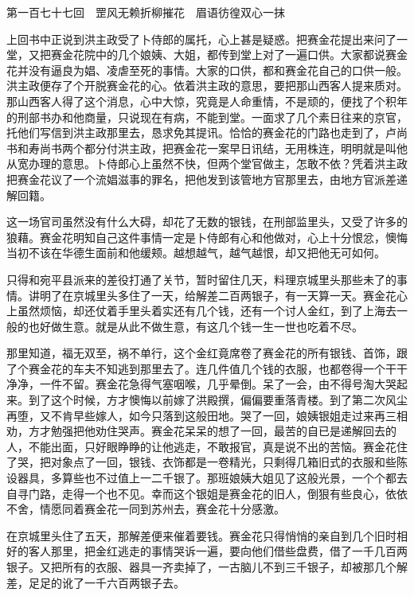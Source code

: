 \documentclass[12pt,UTF8]{ctexbook}
\begin{document}
{{{第一百七十七回　罡风无赖折柳摧花　眉语彷徨双心一抹





上回书中正说到洪主政受了卜侍郎的属托，心上甚是疑惑。把赛金花提出来问了一堂，又把赛金花院中的几个娘姨、大姐，都传到堂上对了一遍口供。大家都说赛金花并没有逼良为娼、凌虐至死的事情。大家的口供，都和赛金花自己的口供一般。洪主政便存了个开脱赛金花的心。依着洪主政的意思，要把那山西客人提来质对。那山西客人得了这个消息，心中大惊，究竟是人命重情，不是顽的，便找了个积年的刑部书办和他商量，只说现在有病，不能到堂。一面求了几个素日往来的京官，托他们写信到洪主政那里去，恳求免其提讯。恰恰的赛金花的门路也走到了，卢尚书和寿尚书两个都分付洪主政，把赛金花一案早日讯结，无用株连，明明就是叫他从宽办理的意思。卜侍郎心上虽然不快，但两个堂官做主，怎敢不依？凭着洪主政把赛金花议了一个流娼滋事的罪名，把他发到该管地方官那里去，由地方官派差递解回籍。

这一场官司虽然没有什么大碍，却花了无数的银钱，在刑部监里头，又受了许多的狼藉。赛金花明知自己这件事情一定是卜侍郎有心和他做对，心上十分恨忿，懊悔当初不该在华德生面前和他缓颊。越想越气，越气越恨，却又把他无可如何。

只得和宛平县派来的差役打通了关节，暂时留住几天，料理京城里头那些未了的事情。讲明了在京城里头多住了一天，给解差二百两银子，有一天算一天。赛金花心上虽然烦恼，却还仗着手里头着实还有几个钱，还有一个讨人金红，到了上海去一般的也好做生意。就是从此不做生意，有这几个钱一生一世也吃着不尽。

那里知道，福无双至，祸不单行，这个金红竟席卷了赛金花的所有银钱、首饰，跟了个赛金花的车夫不知逃到那里去了。连几件值几个钱的衣服，也都卷得一个干干净净，一件不留。赛金花急得气塞咽喉，几乎晕倒。呆了一会，由不得号淘大哭起来。到了这个时候，方才懊悔以前嫁了洪殿撰，偏偏要重落青楼。到了第二次风尘再堕，又不肯早些嫁人，如今只落到这般田地。哭了一回，娘姨银姐走过来再三相劝，方才勉强把他劝住哭声。赛金花呆呆的想了一回，最苦的自已是递解回去的人，不能出面，只好眼睁睁的让他逃走，不敢报官，真是说不出的苦恼。赛金花住了哭，把对象点了一回，银钱、衣饰都是一卷精光，只剩得几箱旧式的衣服和些陈设器具，多算些也不过值上一二千银了。那班娘姨大姐见了这般光景，一个个都去自寻门路，走得一个也不见。幸而这个银姐是赛金花的旧人，倒狠有些良心，依依不舍，情愿同着赛金花一同到苏州去，赛金花十分感激。

在京城里头住了五天，那解差便来催着要钱。赛金花只得悄悄的亲自到几个旧时相好的客人那里，把金红逃走的事情哭诉一遍，要向他们借些盘费，借了一千几百两银子。又把所有的衣服、器具一齐卖掉了，一古脑儿不到三千银子，却被那几个解差，足足的讹了一千六百两银子去。

}}}
\end{document}
